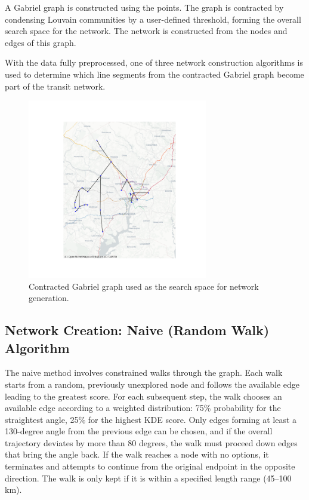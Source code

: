 \documentclass[manuscript]{acmart}
\begin{document}
A Gabriel graph is constructed using the points. The graph is contracted by condensing Louvain communities by a user-defined threshold, forming the overall search space for the network. The network is constructed from the nodes and edges of this graph.

With the data fully preprocessed, one of three network construction algorithms is used to determine which line segments from the contracted Gabriel graph become part of the transit network.

\begin{figure}[h]
    \centering
    \includegraphics[width=0.7\textwidth]{img/network_map_contracted.png}
    \caption{Contracted Gabriel graph used as the search space for network generation.}
    \label{fig:contractedgraph}
\end{figure}

\subsection{Network Creation: Naive (Random Walk) Algorithm}

The naive method involves constrained walks through the graph. Each walk starts from a random, previously unexplored node and follows the available edge leading to the greatest score. For each subsequent step, the walk chooses an available edge according to a weighted distribution: 75\% probability for the straightest angle, 25\% for the highest KDE score. Only edges forming at least a 130-degree angle from the previous edge can be chosen, and if the overall trajectory deviates by more than 80 degrees, the walk must proceed down edges that bring the angle back. If the walk reaches a node with no options, it terminates and attempts to continue from the original endpoint in the opposite direction. The walk is only kept if it is within a specified length range (45--100 km).
\end{document}
